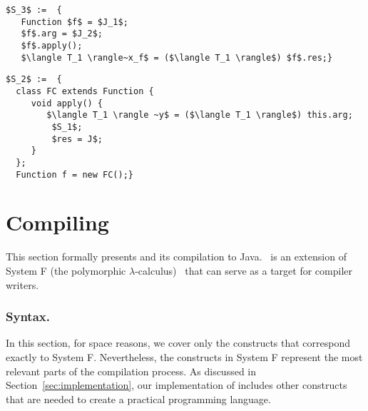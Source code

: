 \HaskellReset

\makeatother
\EndFmtInput
\newcommand{\typeSrc}{T}
\newcommand{\envSrc}{G}

\newsavebox{\simpleapply}
\newsavebox{\normalclosure}

\begin{lrbox}{\simpleapply}
\begin{minipage}{2.5in}
\begin{lstlisting}[mathescape]
$S_3$ :=  {
   Function $f$ = $J_1$;
   $f$.arg = $J_2$;
   $f$.apply();
   $\langle T_1 \rangle~x_f$ = ($\langle T_1 \rangle$) $f$.res;}
\end{lstlisting}
\end{minipage}
\end{lrbox}

\begin{lrbox}{\normalclosure}
\begin{minipage}{2.5in}
\begin{lstlisting}[mathescape]
$S_2$ :=  {
  class FC extends Function {
     void apply() {
        $\langle T_1 \rangle ~y$ = ($\langle T_1 \rangle$) this.arg;
         $S_1$;
         $res = J$;
     }
  };
  Function f = new FC();}
\end{lstlisting}
\end{minipage}
\end{lrbox}

\section{Compiling \Name}\label{sec:fcore}

This section formally presents \name and its compilation to
Java. \Name~is an extension of System F (the polymorphic
$\lambda$-calculus)~\cite{girard72dissertation,reynolds74towards} that
can serve as a target for compiler writers.

\subsubsection{Syntax.}

In this section, for space reasons, we cover only the \name constructs
that correspond exactly to System F. Nevertheless, the constructs in
System F represent the most relevant parts of the compilation
process. As discussed in Section~\ref{sec:implementation}, our
implementation of \name includes other constructs that are
needed to create a practical programming language.

